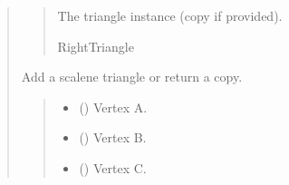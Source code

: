 \documentclass[letterpaper,10pt,english]{sphinxmanual}
\begin{document}
\begin{quote}
\begin{fulllineitems}
\begin{fulllineitems}
\begin{quote}
\begin{description}
\begin{itemize}
\end{itemize}

\sphinxAtStartPar
The triangle instance (copy if provided).

\sphinxAtStartPar
RightTriangle

\end{description}\end{quote}

\end{fulllineitems}


\begin{fulllineitems}
\label{\detokenize{pygeox:pygeox.add_objects.AddNamespace.scalene_triangle}}
\pysigstartsignatures
\pysiglinewithargsret
{}
{\sphinxparamcomma {}\sphinxparamcomma {}\sphinxparamcomma {}\sphinxparamcomma {}}
{}
\pysigstopsignatures
\sphinxAtStartPar
Add a scalene triangle or return a copy.
\begin{quote}\begin{description}
\begin{itemize}
\item {} 
\sphinxAtStartPar
{} (\sphinxstyleliteralemphasis{\sphinxupquote{ | }}) \textendash{} Vertex A.

\item {} 
\sphinxAtStartPar
{} (\sphinxstyleliteralemphasis{\sphinxupquote{ | }}) \textendash{} Vertex B.

\item {} 
\sphinxAtStartPar
{} (\sphinxstyleliteralemphasis{\sphinxupquote{ | }}) \textendash{} Vertex C.


\end{itemize}
\end{description}
\end{quote}
\end{fulllineitems}
\end{fulllineitems}
\end{quote}
\end{document}
